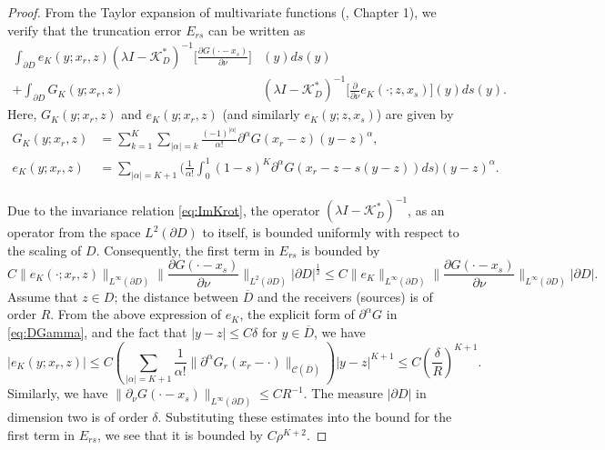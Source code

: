 \begin{proof} From the Taylor expansion of multivariate functions (\cite{Taylor1}, Chapter 1),  we verify that the truncation error $E_{rs}$ can be written as
\begin{equation*}
\begin{aligned}
\int_{\partial D} e_K(y; x_r,z) (\lambda I - \mathcal{K}_D^*)^{-1}
\bigg[\frac{\partial G(\cdot - x_s)}{\partial \nu}\bigg]&(y) ds(y) \\
+ \int_{\partial D}  G_K(y; x_r, z) &(\lambda I -
\mathcal{K}_D^*)^{-1} \bigg[\frac{\partial}{\partial \nu}
e_K(\cdot; z, x_s)\bigg](y) ds(y).
\end{aligned}
\end{equation*}
Here, $G_K(y; x_r,z)$ and $e_K(y; x_r,z)$ (and similarly
$e_K(y; z, x_s)$) are given by\begin{equation*}
\begin{aligned}
G_K(y; x_r,z) &= \sum_{k=1}^K \sum_{|\alpha| = k} \frac{(-1)^{|\alpha|}}{\alpha!} \partial^{\alpha} G(x_r - z) (y-z)^\alpha,\\
 e_K(y; x_r, z) &= \sum_{|\alpha|=K+1} \Big( \frac{1}{\alpha!} \int_0^1 (1-s)^K \partial^\alpha G(x_r - z - s(y-z)) ds \Big) (y-z)^\alpha.
\end{aligned}
\end{equation*}

Due to the invariance relation \eqref{eq:ImKrot}, the operator
$(\lambda I - \mathcal{K}_D^*)^{-1}$, as an operator from the
space $L^2(\partial D)$ to itself, is bounded uniformly with
respect to the scaling of $D$. Consequently, the first term in
$E_{rs}$ is bounded by
\begin{equation*}
C \|e_K(\cdot; x_r,z)\|_{L^\infty(\partial D)} \|\frac{\partial
G(\cdot - x_s)}{\partial \nu}\|_{L^2(\partial D)} |\partial
D|^{\frac{1}{2}} \le C \|e_K\|_{L^\infty(\partial D)}
\|\frac{\partial G(\cdot - x_s)}{\partial
\nu}\|_{L^\infty(\partial D)} |\partial D|.
\end{equation*}
Assume that $z \in D$; the distance between $\overline{D}$ and the
receivers (sources) is of order $R$. From the above expression of
$e_K$, the explicit form of $\partial^\alpha G$ in
\eqref{eq:DGamma}, and the fact that $|y-z| \le C\delta$ for $y
\in \overline{D}$, we have
\begin{equation*}
|e_K(y; x_r, z)| \le C \left(\sum_{|\alpha| = K+1}
\frac{1}{\alpha!} \|\partial^\alpha G_r(x_r -
\cdot)\|_{\mathcal{C}(\overline{D})}\right) |y-z|^{K+1} \le C
\left(\frac{\delta}{R}\right)^{K+1}.
\end{equation*}
Similarly, we have $\|\partial_\nu G(\cdot -
x_s)\|_{L^\infty(\partial D)} \le CR^{-1}$. The measure $|\partial
D|$ in dimension two is of order $\delta$. Substituting these
estimates into the bound for the first term in $E_{rs}$, we see
that it is bounded by $C\rho^{K+2}$.


\end{proof}

